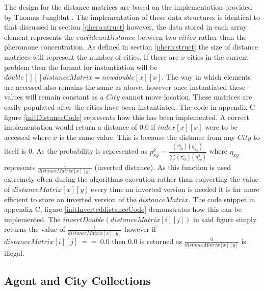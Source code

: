 The design for the distance matrices are based on the implementation provided by Thomas Jungblut \cite{tjung:aco:blog}. The implementation of these data structures is identical to that discussed in section \ref{phero:struct} however, the data stored in each array element represents the $euclideanDistance$ between two $cities$ rather than the pheromone concentration. As defined in section \ref{phero:struct} the size of distance matrices will represent the number of cities. If there are $x$ cities in the current problem then the format for instantiation will be $double[][] distanceMatrix = new double[x][x]$. The way in which elements are accessed also remains the same as above, however once instantiated these values will remain constant as a $City$ cannot move location. These matrices are easily populated after the cities have been instantiated. The code in appendix C figure \ref{initDistanceCode} represents how this has been implemented. A correct implementation would return a distance of $0.0$ if $index[x][x]$ were to be accessed where $x$ is the same value. This is because the distance from any $City$ to itself is 0.
As the probability is represented as $p_{xy}^{k} = \frac{(\tau_{xy}^{\alpha })(\eta _{xy}^{\beta })}{\sum (\tau_{xy}^{\alpha })(\eta _{xy}^{\beta })}$ where $\eta _{xy}$ represents $\frac{1}{distanceMatrix[x][y]}$ (inverted distance). As this function is used extremely often during the algorithms execution rather than converting the value of $distanceMatrix[x][y]$ every time an inverted version is needed it is far more efficient to store an inverted version of the $distanceMatrix$. The code snippet in appendix C, figure \ref{initInverteddistanceCode} demonstrates how this can be implemented. The $invertDouble(distanceMatrix[i][j])$ in said figure simply returns the value of $\frac{1}{distanceMatrix[x][y]}$ however if $distanceMatrix[i][j]\ ==\ 0.0$ then $0.0$ is returned as $\frac{0}{distanceMatrix[x][y]}$ is illegal.
  
\subsection{Agent and City Collections}

